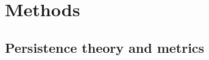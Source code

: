 \documentclass[12pt, oneside]{article}   	%
\begin{document}



\section*{Methods} 

\subsection*{Persistence theory and metrics}
\end{document}

